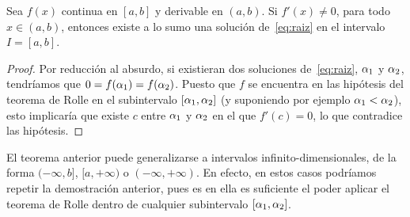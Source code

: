 

\begin{corollary}
  \label{cor:tema1:exist+unic}
  Sea $f(x)$ continua en $[a, b]$ y derivable en $(a, b)$. Si
  $f'(x)\ne 0$, para todo $x\in (a, b)$, entonces existe a lo sumo una
  solución de~\eqref{eq:raiz} en el intervalo $I=[a,b]$.
\end{corollary}

\begin{proof}
  Por reducción al absurdo, si existieran dos soluciones
  de~\eqref{eq:raiz}, $\alpha_1$ y $\alpha_2$, tendríamos que
  $0=f(\alpha_1)=f(\alpha_2)$.  Puesto que $f$ se encuentra en las
  hipótesis del teorema de Rolle en el subintervalo
  $[\alpha_1,\alpha_2]$ (y suponiendo por ejemplo $\alpha_1<\alpha_2$), esto
  implicaría que existe $c$ entre $\alpha_1$ y $\alpha_2$ en el que
  $f'(c)=0$, lo que contradice las hipótesis.
\end{proof}

\begin{remark}
  \label{rk:tema1:exist+unic}
  El teorema anterior puede generalizarse a intervalos
  infinito-dimensionales, de la forma $(-\infty,b]$, $[a,+\infty)$ o
  $(-\infty,+\infty)$. En efecto, en estos casos podríamos repetir la
  demostración anterior, pues es en ella es suficiente el poder
  aplicar el teorema de Rolle dentro de cualquier subintervalo
  $[\alpha_1,\alpha_2]$.
\end{remark}

